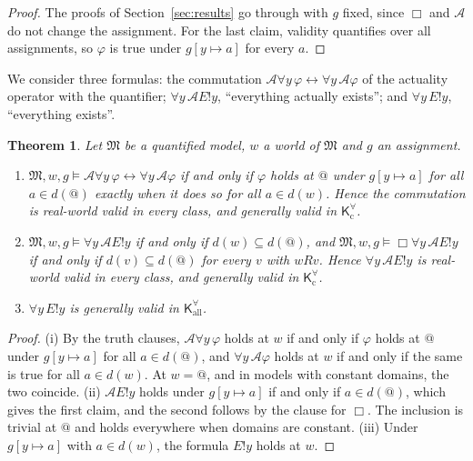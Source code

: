 \documentclass[11pt]{amsart}
\makeatletter
\theoremstyle{plain}
\newtheorem{theorem}{Theorem}[section]
\theoremstyle{definition}
\theoremstyle{remark}
\newcommand{\Act}{\mathcal{A}}
\newcommand{\Mod}{\mathfrak{M}}
\newcommand{\Kl}{\mathsf{K}}
\newcommand{\at}{@}
\makeatother
\begin{document}
\begin{proof}
The proofs of Section~\ref{sec:results} go through with $g$ fixed,
since $\Box$ and $\Act$ do not change the assignment. For the last
claim, validity quantifies over all assignments, so $\varphi$ is true
under $g[y \mapsto a]$ for every $a$.
\end{proof}

We consider three formulas: the commutation
$\Act\forall y\,\varphi \leftrightarrow \forall y\,\Act\varphi$ of the
actuality operator with the quantifier; $\forall y\,\Act E!y$,
``everything actually exists''; and $\forall y\, E!y$, ``everything
exists''.

\begin{theorem}
\label{thm:q-truths}
Let $\Mod$ be a quantified model, $w$ a world of $\Mod$ and $g$ an
assignment.
\begin{enumerate}[label=(\roman*)]
\item $\Mod, w, g \models \Act\forall y\,\varphi \leftrightarrow
  \forall y\,\Act\varphi$ if and only if $\varphi$ holds at $\at$ under
  $g[y \mapsto a]$ for all $a \in d(\at)$ exactly when it does so for
  all $a \in d(w)$. Hence the commutation is real-world valid in every
  class, and generally valid in $\Kl^\forall_{\mathrm{c}}$.
\item $\Mod, w, g \models \forall y\,\Act E!y$ if and only if
  $d(w) \subseteq d(\at)$, and
  $\Mod, w, g \models \Box\forall y\,\Act E!y$ if and only if
  $d(v) \subseteq d(\at)$ for every $v$ with $wRv$. Hence
  $\forall y\,\Act E!y$ is real-world valid in every class, and
  generally valid in $\Kl^\forall_{\mathrm{c}}$.
\item $\forall y\, E!y$ is generally valid in
  $\Kl^\forall_{\mathrm{all}}$.
\end{enumerate}
\end{theorem}

\begin{proof}
(i) By the truth clauses, $\Act\forall y\,\varphi$ holds at $w$ if and
only if $\varphi$ holds at $\at$ under $g[y \mapsto a]$ for all
$a \in d(\at)$, and $\forall y\,\Act\varphi$ holds at $w$ if and only
if the same is true for all $a \in d(w)$. At $w = \at$, and in models
with constant domains, the two coincide.
(ii) $\Act E!y$ holds under $g[y \mapsto a]$ if and only if
$a \in d(\at)$, which gives the first claim, and the second follows by
the clause for $\Box$. The inclusion is trivial at $\at$ and holds
everywhere when domains are constant.
(iii) Under $g[y \mapsto a]$ with $a \in d(w)$, the formula $E!y$
holds at $w$.
\end{proof}
\end{document}
